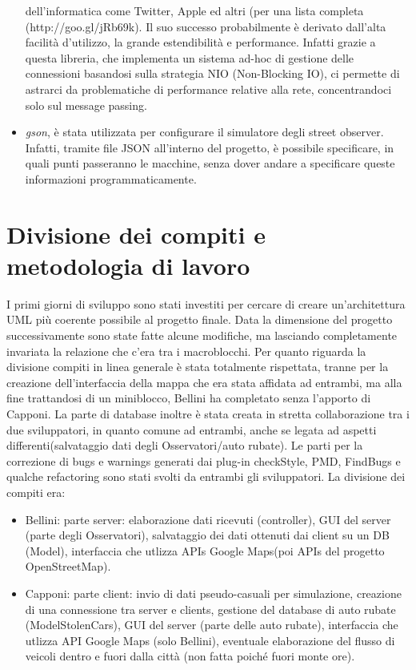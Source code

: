 \documentclass[a4paper,12pt]{report}
\begin{document}
\begin{itemize}
dell'informatica come Twitter, Apple ed altri (per una lista completa 
(http://goo.gl/jRb69k). \newline Il suo successo probabilmente è 
derivato dall'alta facilità d'utilizzo, la grande estendibilità e performance. 
Infatti grazie a questa libreria, che implementa un sistema ad-hoc di gestione 
delle connessioni basandosi sulla strategia NIO (Non-Blocking IO), ci permette 
di astrarci da problematiche di performance relative alla rete, concentrandoci 
solo sul message passing. 
    \item \textit{gson}, è stata utilizzata per configurare il simulatore 
degli street observer. Infatti, tramite file JSON all'interno del progetto, è 
possibile specificare, in quali punti passeranno le macchine, senza dover 
andare a specificare queste informazioni programmaticamente.
  \end{itemize} 

\section{Divisione dei compiti e metodologia di lavoro}

I primi giorni di sviluppo sono stati investiti per cercare di creare 
un'architettura UML più coerente possibile al progetto finale. Data la 
dimensione del progetto successivamente sono state fatte alcune modifiche, ma 
lasciando completamente invariata la relazione che c'era tra i 
macroblocchi.\newline
Per quanto riguarda la divisione compiti in linea generale è stata totalmente 
rispettata, tranne per la creazione dell'interfaccia della mappa che era 
stata affidata ad entrambi, ma alla fine trattandosi di un miniblocco, Bellini 
ha completato senza l'apporto di Capponi. La parte di database inoltre è 
stata creata in stretta collaborazione tra i due sviluppatori, in quanto comune 
ad entrambi, anche se legata ad aspetti differenti(salvataggio dati degli 
Osservatori/auto rubate). 
Le parti per la correzione di bugs e warnings generati dai plug-in checkStyle, 
PMD, FindBugs e qualche refactoring sono stati svolti da entrambi gli 
sviluppatori.\newline
La divisione dei compiti era:
\begin{itemize}
  \item Bellini: parte server: elaborazione dati ricevuti (controller), GUI del 
server (parte degli Osservatori), salvataggio dei dati ottenuti dai client su 
un DB (Model), interfaccia che utlizza APIs Google Maps(poi APIs del progetto 
OpenStreetMap).
  \item Capponi: parte client: invio di dati pseudo-casuali per simulazione, 
creazione di una connessione tra server e clients, gestione del database di 
auto rubate (ModelStolenCars), GUI del server (parte delle auto rubate), 
interfaccia che utlizza API Google Maps (solo Bellini), eventuale elaborazione 
del flusso di veicoli dentro e fuori dalla città (non fatta poiché fuori monte 
ore).
\end{itemize}
\end{document}
